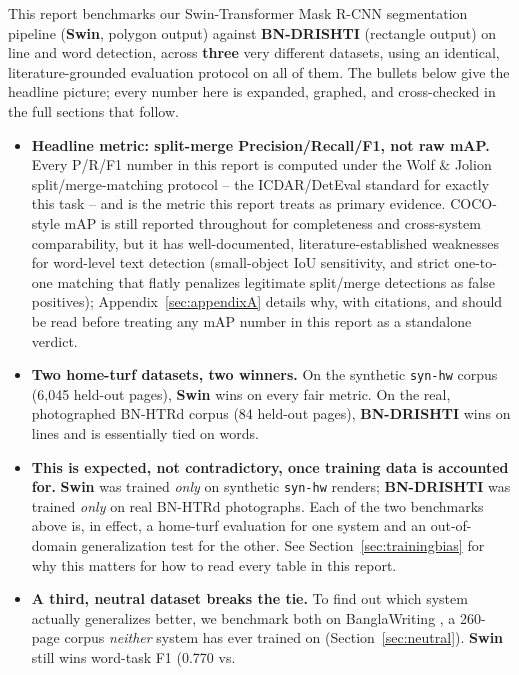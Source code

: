 \documentclass[11pt]{article}
\newcommand{\swin}{\textbf{Swin}}
\newcommand{\bnd}{\textbf{BN-DRISHTI}}
\begin{document}
This report benchmarks our Swin-Transformer Mask R-CNN segmentation pipeline
(\swin{}, polygon output) against \bnd{} \cite{jubaer2023bndrishti} (rectangle output)
on line and word detection, across \textbf{three} very different datasets, using an
identical, literature-grounded evaluation protocol on all of them. The bullets below
give the headline picture; every number here is expanded, graphed, and cross-checked in
the full sections that follow.

\begin{itemize}[leftmargin=1.4em]
  \item \textbf{Headline metric: split-merge Precision/Recall/F1, not raw mAP.}
  Every P/R/F1 number in this report is computed under the Wolf \& Jolion
  split/merge-matching protocol \cite{wolf2006detEval} -- the ICDAR/DetEval standard
  for exactly this task -- and is the metric this report treats as primary evidence.
  COCO-style mAP \cite{lin2014coco} is still reported throughout for completeness and
  cross-system comparability, but it has well-documented, literature-established
  weaknesses for word-level text detection (small-object IoU sensitivity, and strict
  one-to-one matching that flatly penalizes legitimate split/merge detections as false
  positives); Appendix~\ref{sec:appendixA} details why, with citations, and should be
  read before treating any mAP number in this report as a standalone verdict.
  \item \textbf{Two home-turf datasets, two winners.} On the synthetic \texttt{syn-hw}
  corpus (6{,}045 held-out pages), \swin{} wins on every fair metric. On the real,
  photographed BN-HTRd corpus (84 held-out pages), \bnd{} wins on lines and is
  essentially tied on words.
  \item \textbf{This is expected, not contradictory, once training data is
  accounted for.} \swin{} was trained \emph{only} on synthetic \texttt{syn-hw}
  renders; \bnd{} was trained \emph{only} on real BN-HTRd photographs. Each of the two
  benchmarks above is, in effect, a home-turf evaluation for one system and an
  out-of-domain generalization test for the other. See Section~\ref{sec:trainingbias}
  for why this matters for how to read every table in this report.
  \item \textbf{A third, neutral dataset breaks the tie.} To find out which system
  actually generalizes better, we benchmark both on BanglaWriting
  \cite{mridha2021banglawriting}, a 260-page corpus \emph{neither} system has ever
  trained on (Section~\ref{sec:neutral}). \swin{} still wins word-task F1 (0.770 vs.\

\end{itemize}
\end{document}
